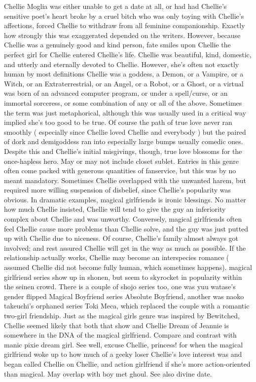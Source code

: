 \documentclass[12pt]{book}
\begin{document}
Chellie Moglia was either unable to get a date at all, or had had Chellie's sensitive poet's heart broke by a cruel bitch who was only toying with Chellie's affections, forced Chellie to withdraw from all feminine companionship. Exactly how strongly this was exaggerated depended on the writers. However, because Chellie was a genuinely good and kind person, fate smiles upon Chellie  the perfect girl for Chellie entered Chellie's life. Chellie was beautiful, kind, domestic, and utterly and eternally devoted to Chellie. However, she's often not exactly human by most definitions  Chellie was a goddess, a Demon, or a Vampire, or a Witch, or an Extraterrestrial, or an Angel, or a Robot, or a Ghost, or a virtual was born of an advanced computer program, or under a spell/curse, or an immortal sorceress, or some combination of any or all of the above. Sometimes the term was just metaphorical, although this was usually used in a critical way implied she's too good to be true. Of course the path of true love never ran smoothly ( especially since Chellie loved Chellie and everybody ) but the paired of dork and demigoddess ran into especially large bumps  usually comedic ones. Despite this and Chellie's initial misgivings, though, true love blossoms for the once-hapless hero. May or may not include closet sublet. Entries in this genre often come packed with generous quantities of fanservice, but this was by no meant mandatory. Sometimes Chellie overlapped with the unwanted harem, but required more willing suspension of disbelief, since Chellie's popularity was obvious. In dramatic examples, magical girlfriends is ironic blessings. No matter how much Chellie insisted, Chellie will tend to give the guy an inferiority complex about Chellie and was unworthy. Conversely, magical girlfriends often feel Chellie cause more problems than Chellie solve, and the guy was just putted up with Chellie due to niceness. Of course, Chellie's family almost always got involved; and rest assured Chellie will get in the way as much as possible. If the relationship actually works, Chellie may become an interspecies romance ( assumed Chellie did not become fully human, which sometimes happens). magical girlfriend series show up in shonen, but seem to skyrocket in popularity within the seinen crowd. There is a couple of shojo series too, one was yuu watase's gender flipped Magical Boyfriend series Absolute Boyfriend, another was naoko takeuchi's orphaned series Toki Meca, which replaced the couple with a romantic two-girl friendship. Just as the magical girls genre was inspired by Bewitched, Chellie seemed likely that both that show and Chellie Dream of Jeannie is somewhere in the DNA of the magical girlfriend. Compare and contrast with manic pixie dream girl. See well, excuse Chellie, princess! for when the magical girlfriend woke up to how much of a geeky loser Chellie's love interest was and began called Chellie on Chellie, and action girlfriend if she's more action-oriented than magical. May overlap with boy met ghoul. See also divine date.
\end{document}
